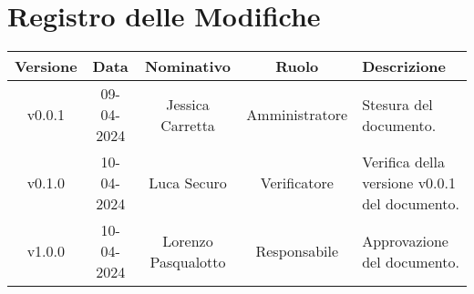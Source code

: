\section*{\Large Registro delle Modifiche}
    \begin{table}[h]
        \centering
        \renewcommand\tabularxcolumn[1]{m{#1}} %
        \renewcommand{\arraystretch}{1.5}
        \begin{tabularx}{0.98\textwidth}
            {c|c|c|c|>{\centering\arraybackslash}X}
            \rowcolor{black}
            \textbf{\color{white} Versione} & \textbf{\color{white} Data} & \textbf{\color{white} Nominativo} & \textbf{\color{white} Ruolo} & \textbf{\color{white} Descrizione} \\ 
            \hline

            v0.0.1 & 09-04-2024 & Jessica Carretta & Amministratore & Stesura del documento.\\
            v0.1.0 & 10-04-2024 & Luca Securo & Verificatore & Verifica della versione v0.0.1 del documento.\\
            v1.0.0 & 10-04-2024 & Lorenzo Pasqualotto & Responsabile & Approvazione del documento.\\
           
            \hline
        \end{tabularx}
    \end{table}